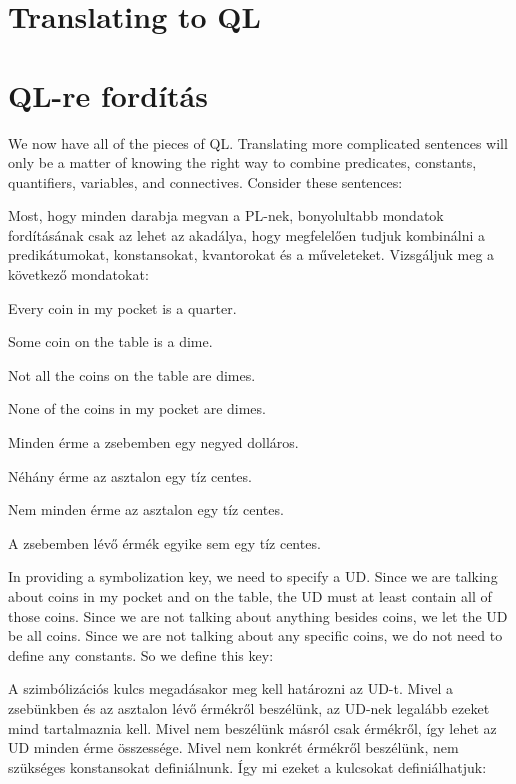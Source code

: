 \section*{Translating to QL}
\section{QL-re fordítás}
We now have all of the pieces of QL. Translating more complicated sentences will only be a matter of knowing the right way to combine predicates, constants, quantifiers, variables, and connectives. Consider these sentences:

Most, hogy minden darabja megvan a PL-nek, bonyolultabb mondatok fordításának csak az lehet az akadálya, hogy megfelelően tudjuk kombinálni a predikátumokat, konstansokat, kvantorokat és a műveleteket. Vizsgáljuk meg a következő mondatokat: 

\begin{earg}
\item[\ex{quan1}] Every coin in my pocket is a quarter.
\item[\ex{quan2}] Some coin on the table is a dime.
\item[\ex{quan3}] Not all the coins on the table are dimes.
\item[\ex{quan4}] None of the coins in my pocket are dimes.
\end{earg}

\begin{earg}
\item[\ex{quan1}] Minden érme a zsebemben egy negyed dolláros.
\item[\ex{quan2}] Néhány érme az asztalon egy tíz centes.
\item[\ex{quan3}] Nem minden érme az asztalon egy tíz centes. 
\item[\ex{quan4}] A zsebemben lévő érmék egyike sem egy tíz centes.
\end{earg}

In providing a symbolization key, we need to specify a UD. Since we are talking about coins in my pocket and on the table, the UD must at least contain all of those coins. Since we are not talking about anything besides coins, we let the UD be all coins. Since we are not talking about any specific coins, we do not need to define any constants. So we define this key:

A szimbólizációs kulcs megadásakor meg kell határozni az UD-t. Mivel a zsebünkben és az asztalon lévő érmékről beszélünk, az UD-nek legalább ezeket mind tartalmaznia kell. Mivel nem beszélünk másról csak érmékről, így lehet az UD minden érme összessége. Mivel nem konkrét érmékről beszélünk, nem szükséges konstansokat definiálnunk. Így mi ezeket a kulcsokat definiálhatjuk:

